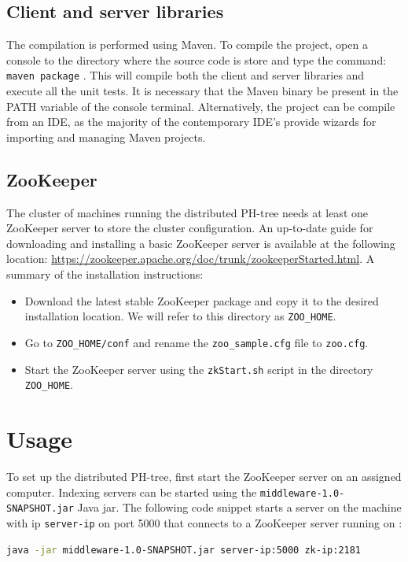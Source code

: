 \documentclass[11pt,a4paper]{globis-book}
\begin{document}
\subsection{Client and server libraries}
The compilation is performed using Maven. To compile the project, open a console to the directory where the source code is store and type the command: \texttt{maven package} . This will compile both the client and server libraries and execute all the unit tests. It is necessary that the Maven binary be present in the PATH variable of the console terminal. Alternatively, the project can be compile from an IDE, as the majority of the contemporary IDE's provide wizards for importing and managing Maven projects.

\subsection{ZooKeeper}
The cluster of machines running the distributed PH-tree needs at least one ZooKeeper server to store the cluster configuration. An up-to-date guide for downloading and installing a basic ZooKeeper server is available at the following location: \url{https://zookeeper.apache.org/doc/trunk/zookeeperStarted.html}. 
A summary of the installation instructions:
\begin{itemize}
    \item Download the latest stable ZooKeeper package and copy it to the desired installation location. We will refer to this directory as \texttt{ZOO\_HOME}.
    \item Go to \texttt{ZOO\_HOME/conf} and rename the \texttt{zoo\_sample.cfg} file to \texttt{zoo.cfg}. 
    \item Start the ZooKeeper server using the \texttt{zkStart.sh} script in the directory \texttt{ZOO\_HOME}.
\end{itemize}

\section{Usage}
To set up the distributed PH-tree, first start the ZooKeeper server on an assigned computer. Indexing servers can be started using the \texttt{middleware-1.0-SNAPSHOT.jar} Java jar.
The following code snippet starts a server on the machine with ip \texttt{server-ip} on port 5000 that connects to a ZooKeeper server running on  : 

\begin{lstlisting}[language=BASH]
    java -jar middleware-1.0-SNAPSHOT.jar server-ip:5000 zk-ip:2181
\end{lstlisting}
\end{document}

